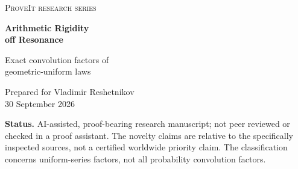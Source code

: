 \documentclass[11pt,letterpaper]{article}
\theoremstyle{definition}
\theoremstyle{remark}
\numberwithin{equation}{section}
\begin{document}
\hypersetup{pageanchor=false}
\begin{titlepage}
\thispagestyle{empty}
\vspace*{0.4in}
{\large\scshape ProveIt research series\par}
\vspace{0.7in}
{\Huge\bfseries Arithmetic Rigidity\\[0.15em] off Resonance\par}
\vspace{0.35in}
{\LARGE Exact convolution factors of\\ geometric-uniform laws\par}
\vspace{0.45in}
{\large Prepared for Vladimir Reshetnikov\\30 September 2026\par}
\vspace{0.55in}
\begin{abstract}
Let $\mu_q$ be the law of $\sum_{k\ge0}q^kU_k$, where the $U_k$ are independent uniforms on $[-1/2,1/2]$. We classify every finite or countable convolution of centered uniform laws that divides $\mu_q$ when no positive power of $q$ is rational. More generally, for any summable family of pairwise rationally incommensurable source widths, divisibility is equivalent to assigning each proposed uniform to a distinct source coordinate and refining that coordinate by an integer. In this setting, cancellation of all Fourier zeros is sufficient for positivity of the quotient.

For geometric factors, this yields the exact parameterization $c=q^a/n$, $\rho=q^m/d$ and reduces simultaneous divisibility to disjointness of arithmetic progressions. We also treat $q=p^{-e/h}$, with $p$ prime and $\gcd(e,h)=1$: the classification separates into $h$ rationality classes, each governed by a prime-adic Hall inequality. A finite-orbit criterion classifies individual geometric factors in this resonant case.

A double-zero obstruction is made quantitative in Wasserstein distance. An explicit family shows that exact factorability can disappear under arbitrarily small parameter changes, even as the distance to the factorable class tends to zero. We distinguish these extensions from earlier repository results, give all analytic and arithmetic proofs, and supply a standard-library verifier with 156,227 executed exact finite checks.
\end{abstract}
\vfill
\noindent\textbf{Status.} AI-assisted, proof-bearing research manuscript; not peer reviewed or checked in a proof assistant. The novelty claims are relative to the specifically inspected sources, not a certified worldwide priority claim. The classification concerns uniform-series factors, not all probability convolution factors.
\end{titlepage}
\hypersetup{pageanchor=true}
\tableofcontents
\clearpage
\end{document}
